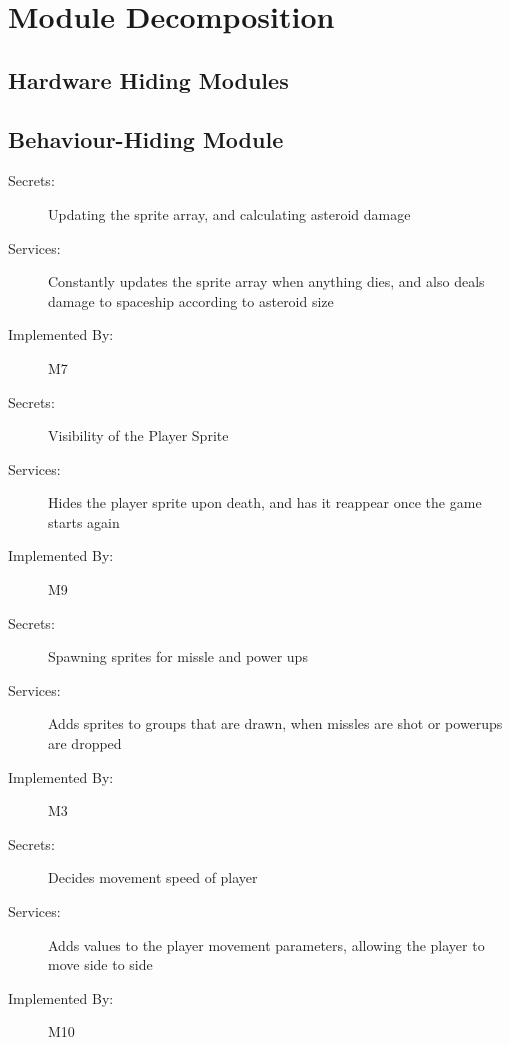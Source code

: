 \documentclass[12pt, titlepage]{article}
\begin{document}
\section{Module Decomposition} \label{SecMD}


\subsection{Hardware Hiding Modules }


\subsection{Behaviour-Hiding Module}

\begin{description}
\item[Secrets:]Updating the sprite array, and calculating asteroid damage
\item[Services:] Constantly updates the sprite array when anything dies, and also deals damage to spaceship according to asteroid size
\item[Implemented By:] M7
\end{description}

\begin{description}
	\item[Secrets:]Visibility of the Player Sprite
	\item[Services:] Hides the player sprite upon death, and has it reappear once the game starts again
	\item[Implemented By:] M9
\end{description}

\begin{description}
	\item[Secrets:]Spawning sprites for missle and power ups
	\item[Services:] Adds sprites to groups that are drawn, when missles are shot or powerups are dropped
	\item[Implemented By:] M3	
\end{description}

\begin{description}
	\item[Secrets:]Decides movement speed of player
	\item[Services:] Adds values to the player movement parameters, allowing the player to move side to side
	\item[Implemented By:] M10
\end{description}
\end{document}
